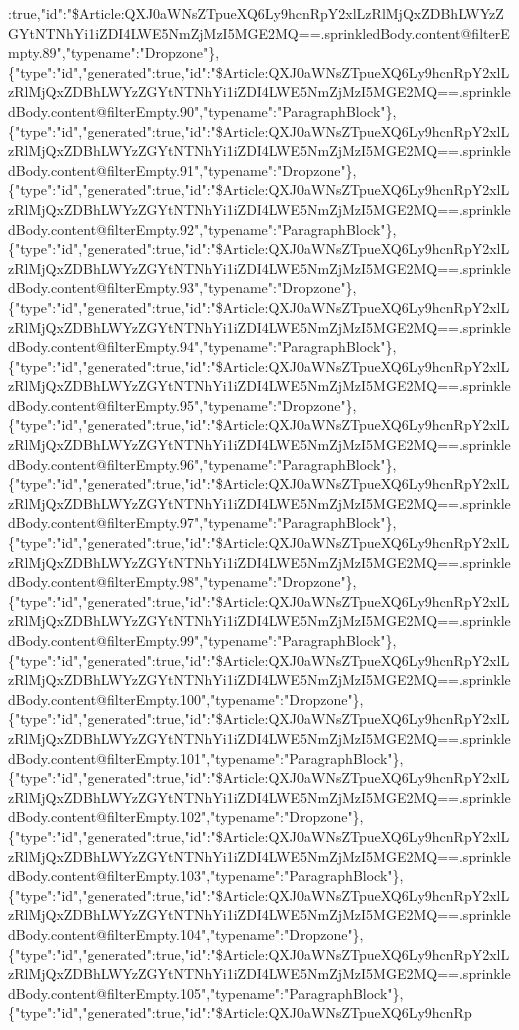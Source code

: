 :true,"id":"\$Article:QXJ0aWNsZTpueXQ6Ly9hcnRpY2xlLzRlMjQxZDBhLWYzZGYtNTNhYi1iZDI4LWE5NmZjMzI5MGE2MQ==.sprinkledBody.content@filterEmpty.89","typename":"Dropzone"\},\{"type":"id","generated":true,"id":"\$Article:QXJ0aWNsZTpueXQ6Ly9hcnRpY2xlLzRlMjQxZDBhLWYzZGYtNTNhYi1iZDI4LWE5NmZjMzI5MGE2MQ==.sprinkledBody.content@filterEmpty.90","typename":"ParagraphBlock"\},\{"type":"id","generated":true,"id":"\$Article:QXJ0aWNsZTpueXQ6Ly9hcnRpY2xlLzRlMjQxZDBhLWYzZGYtNTNhYi1iZDI4LWE5NmZjMzI5MGE2MQ==.sprinkledBody.content@filterEmpty.91","typename":"Dropzone"\},\{"type":"id","generated":true,"id":"\$Article:QXJ0aWNsZTpueXQ6Ly9hcnRpY2xlLzRlMjQxZDBhLWYzZGYtNTNhYi1iZDI4LWE5NmZjMzI5MGE2MQ==.sprinkledBody.content@filterEmpty.92","typename":"ParagraphBlock"\},\{"type":"id","generated":true,"id":"\$Article:QXJ0aWNsZTpueXQ6Ly9hcnRpY2xlLzRlMjQxZDBhLWYzZGYtNTNhYi1iZDI4LWE5NmZjMzI5MGE2MQ==.sprinkledBody.content@filterEmpty.93","typename":"Dropzone"\},\{"type":"id","generated":true,"id":"\$Article:QXJ0aWNsZTpueXQ6Ly9hcnRpY2xlLzRlMjQxZDBhLWYzZGYtNTNhYi1iZDI4LWE5NmZjMzI5MGE2MQ==.sprinkledBody.content@filterEmpty.94","typename":"ParagraphBlock"\},\{"type":"id","generated":true,"id":"\$Article:QXJ0aWNsZTpueXQ6Ly9hcnRpY2xlLzRlMjQxZDBhLWYzZGYtNTNhYi1iZDI4LWE5NmZjMzI5MGE2MQ==.sprinkledBody.content@filterEmpty.95","typename":"Dropzone"\},\{"type":"id","generated":true,"id":"\$Article:QXJ0aWNsZTpueXQ6Ly9hcnRpY2xlLzRlMjQxZDBhLWYzZGYtNTNhYi1iZDI4LWE5NmZjMzI5MGE2MQ==.sprinkledBody.content@filterEmpty.96","typename":"ParagraphBlock"\},\{"type":"id","generated":true,"id":"\$Article:QXJ0aWNsZTpueXQ6Ly9hcnRpY2xlLzRlMjQxZDBhLWYzZGYtNTNhYi1iZDI4LWE5NmZjMzI5MGE2MQ==.sprinkledBody.content@filterEmpty.97","typename":"ParagraphBlock"\},\{"type":"id","generated":true,"id":"\$Article:QXJ0aWNsZTpueXQ6Ly9hcnRpY2xlLzRlMjQxZDBhLWYzZGYtNTNhYi1iZDI4LWE5NmZjMzI5MGE2MQ==.sprinkledBody.content@filterEmpty.98","typename":"Dropzone"\},\{"type":"id","generated":true,"id":"\$Article:QXJ0aWNsZTpueXQ6Ly9hcnRpY2xlLzRlMjQxZDBhLWYzZGYtNTNhYi1iZDI4LWE5NmZjMzI5MGE2MQ==.sprinkledBody.content@filterEmpty.99","typename":"ParagraphBlock"\},\{"type":"id","generated":true,"id":"\$Article:QXJ0aWNsZTpueXQ6Ly9hcnRpY2xlLzRlMjQxZDBhLWYzZGYtNTNhYi1iZDI4LWE5NmZjMzI5MGE2MQ==.sprinkledBody.content@filterEmpty.100","typename":"Dropzone"\},\{"type":"id","generated":true,"id":"\$Article:QXJ0aWNsZTpueXQ6Ly9hcnRpY2xlLzRlMjQxZDBhLWYzZGYtNTNhYi1iZDI4LWE5NmZjMzI5MGE2MQ==.sprinkledBody.content@filterEmpty.101","typename":"ParagraphBlock"\},\{"type":"id","generated":true,"id":"\$Article:QXJ0aWNsZTpueXQ6Ly9hcnRpY2xlLzRlMjQxZDBhLWYzZGYtNTNhYi1iZDI4LWE5NmZjMzI5MGE2MQ==.sprinkledBody.content@filterEmpty.102","typename":"Dropzone"\},\{"type":"id","generated":true,"id":"\$Article:QXJ0aWNsZTpueXQ6Ly9hcnRpY2xlLzRlMjQxZDBhLWYzZGYtNTNhYi1iZDI4LWE5NmZjMzI5MGE2MQ==.sprinkledBody.content@filterEmpty.103","typename":"ParagraphBlock"\},\{"type":"id","generated":true,"id":"\$Article:QXJ0aWNsZTpueXQ6Ly9hcnRpY2xlLzRlMjQxZDBhLWYzZGYtNTNhYi1iZDI4LWE5NmZjMzI5MGE2MQ==.sprinkledBody.content@filterEmpty.104","typename":"Dropzone"\},\{"type":"id","generated":true,"id":"\$Article:QXJ0aWNsZTpueXQ6Ly9hcnRpY2xlLzRlMjQxZDBhLWYzZGYtNTNhYi1iZDI4LWE5NmZjMzI5MGE2MQ==.sprinkledBody.content@filterEmpty.105","typename":"ParagraphBlock"\},\{"type":"id","generated":true,"id":"\$Article:QXJ0aWNsZTpueXQ6Ly9hcnRp